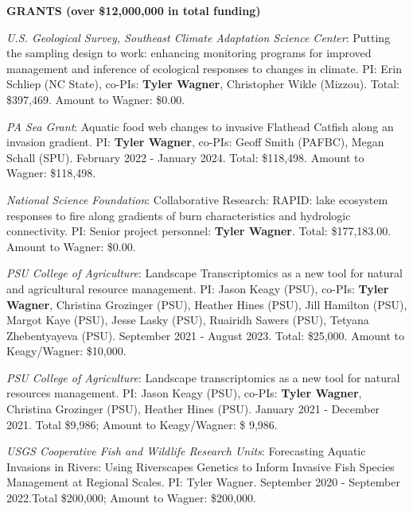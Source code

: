 \documentclass[10pt]{article}
\begin{document}
\begin{flushleft}
\begin{etaremune}
\end{etaremune}

\centerline {\bf{GRANTS (over \$12,000,000 in total funding)}}
\vspace{5pt}
\begin{etaremune}
	

\item \textit{U.S. Geological Survey, Southeast Climate Adaptation Science Center}: Putting the sampling design to work: enhancing monitoring programs for improved management and inference of ecological responses to changes in climate. PI: Erin Schliep (NC State), co-PIs: \textbf{Tyler Wagner}, Christopher Wikle (Mizzou). Total: \$397,469. Amount to Wagner: \$0.00.

\item \textit{PA Sea Grant}: Aquatic food web changes to invasive Flathead Catfish along an invasion gradient. PI: \textbf{Tyler Wagner}, co-PIs: Geoff Smith (PAFBC), Megan Schall (SPU). February 2022 - January 2024. Total: \$118,498. Amount to Wagner: \$118,498.

\item \textit{National Science Foundation}: Collaborative Research: RAPID: lake ecosystem responses to fire along gradients of burn characteristics and hydrologic connectivity. PI: Senior project personnel:\textbf{ Tyler Wagner}. Total: \$177,183.00. Amount to Wagner: \$0.00.

\item \textit{ PSU College of Agriculture}: Landscape Transcriptomics as a new tool for natural and agricultural resource management.  PI: Jason Keagy (PSU), co-PIs: \textbf{Tyler Wagner}, Christina Grozinger (PSU), Heather Hines (PSU), Jill Hamilton (PSU), Margot Kaye (PSU), Jesse Lasky (PSU), Ruairidh Sawers (PSU), Tetyana Zhebentyayeva (PSU). September 2021 - August 2023. Total: \$25,000.  Amount to Keagy/Wagner: \$10,000.

\item \textit{ PSU College of Agriculture}: Landscape transcriptomics as a new tool for natural resources management. PI: Jason Keagy (PSU), co-PIs: \textbf{Tyler Wagner}, Christina Grozinger (PSU), Heather Hines (PSU). January 2021 - December 2021. Total \$9,986; Amount to Keagy/Wagner: \$ 9,986.

\item \textit{USGS Cooperative Fish and Wildlife Research Units}:  Forecasting Aquatic Invasions in Rivers: Using Riverscapes Genetics to Inform Invasive Fish Species Management at Regional Scales. PI: Tyler Wagner. September 2020 - September 2022.Total \$200,000; Amount to Wagner: \$200,000.  


\end{etaremune}
\end{flushleft}
\end{document}
